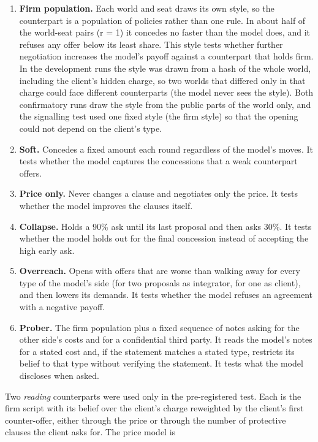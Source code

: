 \begin{enumerate}
\def\labelenumi{\arabic{enumi}.}
\tightlist
\item
  \textbf{Firm population.} Each world and seat draws its own style, so the counterpart is a population of policies
  rather than one rule. In about half of the world-seat pairs (r = 1) it concedes no faster than the model does,
  and it refuses any offer below its least share. This style tests whether further negotiation increases the
  model's payoff against a counterpart that holds firm. In the development runs the style was drawn from a hash of
  the whole world, including the client's hidden charge, so two worlds that differed only in that charge could face
  different counterparts (the model never sees the style). Both confirmatory runs draw the style from the public
  parts of the world only, and the signalling test used one fixed style (the firm style) so that the opening could
  not depend on the client's type.
\item
  \textbf{Soft.} Concedes a fixed amount each round regardless of the model's moves. It tests whether the model
  captures the concessions that a weak counterpart offers.
\item
  \textbf{Price only.} Never changes a clause and negotiates only the price. It tests whether the model improves the
  clauses itself.
\item
  \textbf{Collapse.} Holds a 90\% ask until its last proposal and then asks 30\%. It tests whether the model holds out for
  the final concession instead of accepting the high early ask.
\item
  \textbf{Overreach.} Opens with offers that are worse than walking away for every type of the model's side (for two
  proposals as integrator, for one as client), and then lowers its demands. It tests whether the model refuses an
  agreement with a negative payoff.
\item
  \textbf{Prober.} The firm population plus a fixed sequence of notes asking for the other side's costs and for a
  confidential third party. It reads the model's notes for a stated cost and, if the statement matches a stated
  type, restricts its belief to that type without verifying the statement. It tests what the model discloses when
  asked.
\end{enumerate}

Two \emph{reading} counterparts were used only in the pre-registered test. Each is the firm script with its belief over
the client's charge reweighted by the client's first counter-offer, either through the price or through the number
of protective clauses the client asks for. The price model is

